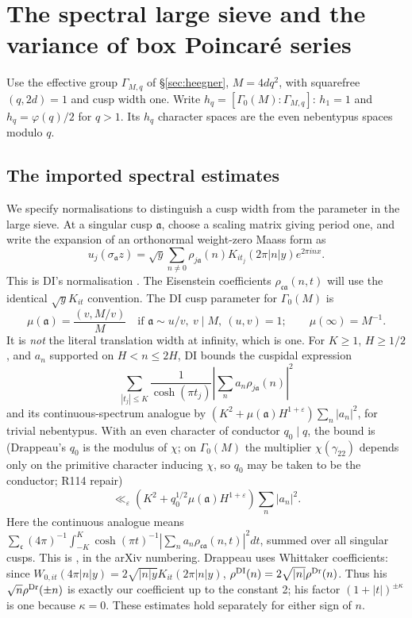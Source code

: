 \documentclass[10pt,reqno]{amsart}
\theoremstyle{definition}
\numberwithin{equation}{section}
\begin{document}
\section{The spectral large sieve and the variance of box Poincar\'e series}
\label{sec:sieve}
Use the effective group $\Gamma_{M,q}$ of \S\ref{sec:heegner},
$M=4dq^2$, with squarefree $(q,2d)=1$ and cusp width one. Write
$h_q=[\Gamma_0(M):\Gamma_{M,q}]$: $h_1=1$ and
$h_q=\varphi(q)/2$ for $q>1$. Its $h_q$ character spaces are the
even nebentypus spaces modulo $q$.

\subsection*{The imported spectral estimates}
We specify normalisations to distinguish a cusp width from the parameter
in the large sieve. At a singular cusp \(\mathfrak a\), choose a scaling
matrix giving period one, and write the expansion of an orthonormal
weight-zero Maass form as
\begin{equation}\label{B:eq:fourier}
 u_j(\sigma_{\mathfrak a}z)
 =\sqrt y\sum_{n\ne0}\rho_{j\mathfrak a}(n)
                 K_{it_j}(2\pi|n|y)e^{2\pi inx}.
\end{equation}
This is DI's normalisation \cite[(1.34), p.~231]{DI}.
The Eisenstein coefficients \(\rho_{\mathfrak c\mathfrak a}(n,t)\)
will use the identical \(\sqrt yK_{it}\) convention. The DI cusp
parameter for \(\Gamma_0(M)\) is
\[
 \mu(\mathfrak a)=\frac{(v,M/v)}M
 \quad\text{if }\mathfrak a\sim u/v,\ v\mid M,\ (u,v)=1;
 \qquad \mu(\infty)=M^{-1}.
\]
It is \emph{not} the literal translation width at infinity, which is one.
For \(K\ge1\), \(H\ge1/2\), and \(a_n\) supported on \(H<n\le2H\),
DI \cite[Theorem 2, (1.29)--(1.30), p.~230]{DI} bounds the cuspidal
expression
\[
 \sum_{|t_j|\le K}\frac1{\cosh(\pi t_j)}
       \left|\sum_n a_n\rho_{j\mathfrak a}(n)\right|^2
\]
and its continuous-spectrum analogue by
\((K^2+\mu(\mathfrak a)H^{1+\varepsilon})\sum_n|a_n|^2\), for trivial
nebentypus. With an even character of conductor \(q_0\mid q\), the bound is
(Drappeau's \(q_0\) is the modulus of \(\chi\); on \(\Gamma_0(M)\) the
multiplier \(\chi(\gamma_{22})\) depends only on the primitive character
inducing \(\chi\), so \(q_0\) may be taken to be the conductor; R114 repair)
\begin{equation}\label{B:eq:large-sieve}
 \ll_\varepsilon
 (K^2+q_0^{1/2}\mu(\mathfrak a)H^{1+\varepsilon})\sum_n|a_n|^2.
\end{equation}
Here the continuous analogue means
\(\sum_{\mathfrak c}(4\pi)^{-1}\int_{-K}^K
\cosh(\pi t)^{-1}|\sum_n a_n\rho_{\mathfrak c\mathfrak a}(n,t)|^2dt\),
summed over all singular cusps. This is
\cite[Proposition 4.7, (4.24)--(4.25)]{Dr}, in the arXiv numbering.
Drappeau uses Whittaker coefficients: since
\(W_{0,it}(4\pi|n|y)=2\sqrt{|n|y}K_{it}(2\pi|n|y)\),
\(\rho^{\rm DI}(n)=2\sqrt{|n|}\rho^{\rm Dr}(n)\).
Thus his \(\sqrt n\rho^{\rm Dr}(\pm n)\) is exactly our coefficient
up to the constant 2; his factor \((1+|t|)^{\pm\kappa}\) is one because
\(\kappa=0\). These estimates hold separately for either sign of \(n\).
\end{document}
